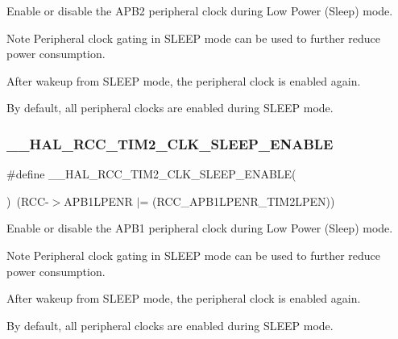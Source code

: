 Enable or disable the A\+P\+B2 peripheral clock during Low Power (Sleep) mode. 

\begin{DoxyNote}{Note}
Peripheral clock gating in S\+L\+E\+EP mode can be used to further reduce power consumption. 

After wakeup from S\+L\+E\+EP mode, the peripheral clock is enabled again. 

By default, all peripheral clocks are enabled during S\+L\+E\+EP mode. 
\end{DoxyNote}
\mbox{\label{group___r_c_c_ex___peripheral___clock___sleep___enable___disable_ga975142c90b4e1baf21b361524518235d}} 
\subsubsection{\texorpdfstring{\_\_HAL\_RCC\_TIM2\_CLK\_SLEEP\_ENABLE}{\_\_HAL\_RCC\_TIM2\_CLK\_SLEEP\_ENABLE}}
{\footnotesize\ttfamily \#define \+\_\+\+\_\+\+H\+A\+L\+\_\+\+R\+C\+C\+\_\+\+T\+I\+M2\+\_\+\+C\+L\+K\+\_\+\+S\+L\+E\+E\+P\+\_\+\+E\+N\+A\+B\+LE(\begin{DoxyParamCaption}{ }\end{DoxyParamCaption})~(R\+CC-\/$>$A\+P\+B1\+L\+P\+E\+NR $\vert$= (R\+C\+C\+\_\+\+A\+P\+B1\+L\+P\+E\+N\+R\+\_\+\+T\+I\+M2\+L\+P\+EN))}



Enable or disable the A\+P\+B1 peripheral clock during Low Power (Sleep) mode. 

\begin{DoxyNote}{Note}
Peripheral clock gating in S\+L\+E\+EP mode can be used to further reduce power consumption. 

After wakeup from S\+L\+E\+EP mode, the peripheral clock is enabled again. 

By default, all peripheral clocks are enabled during S\+L\+E\+EP mode. 
\end{DoxyNote}
